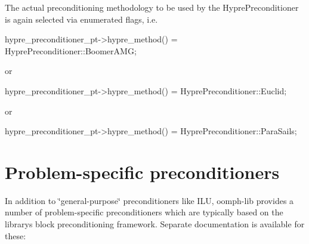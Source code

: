 The actual preconditioning methodology to be used by the {\ttfamily Hypre\+Preconditioner} is again selected via enumerated flags, i.\+e.


\begin{DoxyCodeInclude}
     hypre\_preconditioner\_pt->hypre\_method() = HyprePreconditioner::BoomerAMG;

\end{DoxyCodeInclude}


or


\begin{DoxyCodeInclude}
     hypre\_preconditioner\_pt->hypre\_method() = HyprePreconditioner::Euclid;

\end{DoxyCodeInclude}


or


\begin{DoxyCodeInclude}
     hypre\_preconditioner\_pt->hypre\_method() = HyprePreconditioner::ParaSails;

\end{DoxyCodeInclude}




 

\hypertarget{index_specific_precond}{}\section{Problem-\/specific preconditioners}\label{index_specific_precond}
In addition to \char`\"{}general-\/purpose\char`\"{} preconditioners like I\+LU, {\ttfamily oomph-\/lib} provides a number of problem-\/specific preconditioners which are typically based on the library\textquotesingle{}s block preconditioning framework. Separate documentation is available for these\+:


